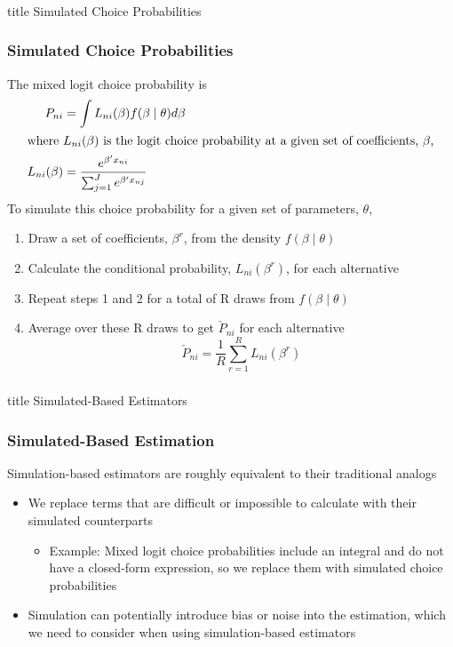 \documentclass{beamer}
\begin{document}
\begin{frame}\frametitle{}
    \vfill
    \centering
    \begin{beamercolorbox}[center]{title}
        \Large Simulated Choice Probabilities
    \end{beamercolorbox}
    \vfill
\end{frame}

\begin{frame}\frametitle{Simulated Choice Probabilities}
    The mixed logit choice probability is
    \begin{align*}
        P_{ni} &= \int L_{ni}(\beta) f(\beta \mid \theta) d \beta \\
        \intertext{where $L_{ni}(\beta)$ is the logit choice probability at a given set of coefficients, $\beta$,}
        L_{ni}(\beta) &= \frac{e^{\beta' x_{ni}}}{\sum_{j = 1}^J e^{\beta' x_{nj}}}
    \end{align*}
    To simulate this choice probability for a given set of parameters, $\theta$,
    \begin{enumerate}
        \item Draw a set of coefficients, $\beta^r$, from the density $f(\beta \mid \theta)$
        \item Calculate the conditional probability, $L_{ni}(\beta^r)$, for each alternative
        \item Repeat steps 1 and 2 for a total of R draws from $f(\beta \mid \theta)$
        \item Average over these R draws to get $\check{P}_{ni}$ for each alternative
        $$\check{P}_{ni} = \frac{1}{R} \sum_{r = 1}^R L_{ni}(\beta^r)$$
    \end{enumerate}
\end{frame}

\begin{frame}\frametitle{}
    \vfill
    \centering
    \begin{beamercolorbox}[center]{title}
        \Large Simulated-Based Estimators
    \end{beamercolorbox}
    \vfill
\end{frame}

\begin{frame}\frametitle{Simulated-Based Estimation}
    Simulation-based estimators are roughly equivalent to their traditional analogs
    \begin{itemize}
        \item We replace terms that are difficult or impossible to calculate with their simulated counterparts
        \begin{itemize}
            \item Example: Mixed logit choice probabilities include an integral and do not have a closed-form expression, so we replace them with simulated choice probabilities
        \end{itemize}
        \item Simulation can potentially introduce bias or noise into the estimation, which we need to consider when using simulation-based estimators
    \end{itemize}
\end{frame}
\end{document}
